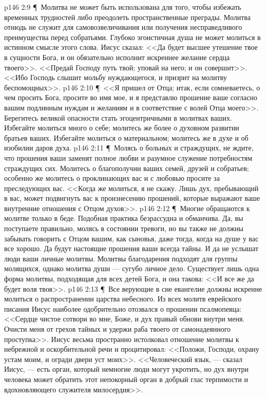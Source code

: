 \vs p146 2:9 \P\ \bibnobreakspace Молитва не может быть использована для того, чтобы избежать временных трудностей либо преодолеть пространственные преграды. Молитва отнюдь не служит для самовозвеличивания или получения несправедливого преимущества перед собратьями. Глубоко эгоистичная душа не может молиться в истинном смысле этого слова. Иисус сказал: <<Да будет высшее утешение твое в сущности Бога, и он обязательно исполнит искреннее желание сердца твоего>>. <<Предай Господу путь твой; уповай на него; и он совершит>>. <<Ибо Господь слышит мольбу нуждающегося, и призрит на молитву беспомощных>>.
\vs p146 2:10 \P\ \bibnobreakspace <<Я пришел от Отца; итак, если сомневаетесь, о чем просить Бога, просите во имя мое, и я представлю прошение ваше согласно вашим подлинным нуждам и желаниям и в соответствие с волей Отца моего>>. Берегитесь великой опасности стать эгоцентричными в молитвах ваших. Избегайте молиться много о себе; молитесь же более о духовном развитии братьев ваших. Избегайте молиться о материальном; молитесь же в духе и об изобилии даров духа.
\vs p146 2:11 \P\ \bibnobreakspace Молясь о больных и страждущих, не ждите, что прошения ваши заменят полное любви и разумное служение потребностям страждущих сих. Молитесь о благополучии ваших семей, друзей и собратьев; особенно же молитесь о проклинающих вас и с любовью просите за преследующих вас. <<Когда же молиться, я не скажу. Лишь дух, пребывающий в вас, может подвигнуть вас к произнесению прошений, которые выражают ваше внутренние отношения с Отцом духов>>.
\vs p146 2:12 \P\ \bibnobreakspace Многие обращаются к молитве только в беде. Подобная практика безрассудна и обманчива. Да, вы поступаете правильно, молясь в состоянии тревоги, но вы также не должны забывать говорить с Отцом вашим, как сыновья, даже тогда, когда на душе у вас все хорошо. Да будут настоящие прошения ваши всегда тайны. И да не услышат люди ваши личные молитвы. Молитвы благодарения подходят для группы молящихся, однако молитва души --- сугубо личное дело. Существует лишь одна форма молитвы, подходящая для всех детей Бога, и она такова: <<И все же да будет воля твоя>>.
\vs p146 2:13 \P\ \bibnobreakspace Все верующие в сие евангелие должны искренне молиться о распространении царства небесного. Из всех молитв еврейского писания Иисус наиболее одобрительно отозвался о прошении псалмопевца: <<Сердце чистое сотвори во мне, Боже, и дух правый обнови внутри меня. Очисти меня от грехов тайных и удержи раба твоего от самонадеянного проступка>>. Иисус весьма пространно истолковал отношение молитвы к небрежной и оскорбительной речи и процитировал: <<Положи, Господи, охрану устам моим, и огради двери уст моих>>. <<Человеческий язык, --- сказал Иисус, --- есть орган, который немногие люди могут укротить, но дух внутри человека может обратить этот непокорный орган в добрый глас терпимости и вдохновляющего служителя милосердия>>.
